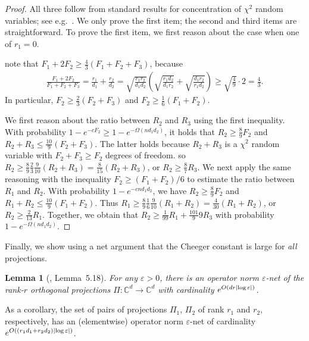 \documentclass[aos]{imsart}
\newtheorem{lemma}[theorem]{Lemma}
\theoremstyle{definition}
\numberwithin{equation}{section}
\DeclarePairedDelimiter{\abs}{\lvert}{\rvert}
\newcommand{\C}{{\mathbb{C}}}
\newcommand{\eps}{\varepsilon}
\newcommand{\MW}[1]{{\color{red}[MW: #1]}}
\newcommand{\MW}[1]{{}}
\begin{document}
\begin{appendix}
\begin{proof}
All three follow from standard results for concentration of $\chi^2$ random variables; see e.g.~\cite{W19}.
We only prove the first item; the second and third items are straightforward.
To prove the first item, we first reason about the case when one of $r_1  = 0$.

note that $F_1 + 2 F_2 \geq \frac43(F_1 + F_2 + F_3)$, because
\begin{align*}
  \frac{F_1 + 2 F_2}{F_1 + F_2 + F_3}
= \frac{r_1}{d_1} + \frac{r_2}{d_2}
= \sqrt{\frac{r_1r_2}{d_1d_2}} \left( \sqrt{\frac{r_1 d_2}{d_1 r_2}} + \sqrt{\frac{d_1 r_2}{r_1 d_2}} \right)
\geq \sqrt{\frac49} \cdot 2 = \frac43.
\end{align*}
In particular, $F_2 \geq \frac23(F_2 + F_3)$ and $F_2 \geq \frac16(F_1 + F_2)$. %

We first reason about the ratio between $R_2$ and $R_3$ using the first inequality.
With probability $1 - e^{- c F_2} \geq 1 - e^{- \Omega(n d_1 d_2)}$, it holds that $R_2 \geq \frac89 F_2$ and $R_2 + R_3 \leq \frac{10}9 (F _2 + F_3)$. The latter holds because $R_2 + R_3$ is a $\chi^2$ random variable with $F_2 + F_3 \geq F_2$ degrees of freedom. so $R_2 \geq \frac89 \frac23 \frac9{10} (R_2 + R_3) = \frac8{15} (R_2 + R_3)$, or $R_2 \geq \frac87 R_3$.
We next apply the same reasoning with the inequality $F_2 \geq (F_1 + F_2)/6$ to estimate the ratio between $R_1$ and $R_2$.
With probability $1 - e^{- c n d_1 d_2}$, we have $R_2 \geq \frac89 F_2$ and $R_1 + R_2 \leq \frac{10}9 (F_1 + F_2)$.
Thus $R_1 \geq \frac89 \frac16 \frac9{10} (R_1 + R_2) = \frac4{30} (R_1 + R_2)$, or $R_2 \geq \frac2{13} R_1$.
Together, we obtain that $R_2 \geq \frac1{99} R_1 + \frac{101}99 R_3$ with probability~$1 - e^{-\Omega( n d_1 d_2)}$.
\end{proof}

Finally, we show using a net argument that the Cheeger constant is large for \emph{all} projections.

\begin{lemma}[\cite{FM20}, Lemma~5.18]\label{lem:net}
For any $\eps>0$, there is an operator norm $\eps$-net of the rank-$r$ orthogonal projections $\Pi\colon \C^d \to \C^d$ with cardinality $e^{O(d r \abs{\log\eps})}$.
\end{lemma}

As a corollary, the set of pairs of projections $\Pi_1$, $\Pi_2$ of rank $r_1$ and $r_2$, respectively, has an (elementwise) operator norm $\eps$-net of cardinality $e^{O((r_1 d_1 + r_2 d_2) \abs{\log \eps})}$.


\end{appendix}
\end{document}
